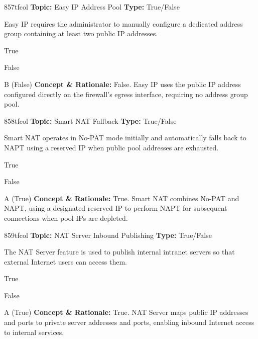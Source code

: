 \begin{qcard}{857}{tfcol}
\textcolor{darkslate!75}{\small\textbf{Topic:} Easy IP Address Pool \hfill \textbf{Type:} True/False}\vspace{0.4em}\par
Easy IP requires the administrator to manually configure a dedicated address group containing at least two public IP addresses.
\begin{qoptions}
\item True
\item False
\end{qoptions}
\end{qcard}
\nopagebreak
\begin{explainbox}{B (False)}
\textbf{Concept \& Rationale:} False. Easy IP uses the public IP address configured directly on the firewall's egress interface, requiring no address group pool.
\end{explainbox}

\begin{qcard}{858}{tfcol}
\textcolor{darkslate!75}{\small\textbf{Topic:} Smart NAT Fallback \hfill \textbf{Type:} True/False}\vspace{0.4em}\par
Smart NAT operates in No-PAT mode initially and automatically falls back to NAPT using a reserved IP when public pool addresses are exhausted.
\begin{qoptions}
\item True
\item False
\end{qoptions}
\end{qcard}
\nopagebreak
\begin{explainbox}{A (True)}
\textbf{Concept \& Rationale:} True. Smart NAT combines No-PAT and NAPT, using a designated reserved IP to perform NAPT for subsequent connections when pool IPs are depleted.
\end{explainbox}

\begin{qcard}{859}{tfcol}
\textcolor{darkslate!75}{\small\textbf{Topic:} NAT Server Inbound Publishing \hfill \textbf{Type:} True/False}\vspace{0.4em}\par
The NAT Server feature is used to publish internal intranet servers so that external Internet users can access them.
\begin{qoptions}
\item True
\item False
\end{qoptions}
\end{qcard}
\nopagebreak
\begin{explainbox}{A (True)}
\textbf{Concept \& Rationale:} True. NAT Server maps public IP addresses and ports to private server addresses and ports, enabling inbound Internet access to internal services.
\end{explainbox}

